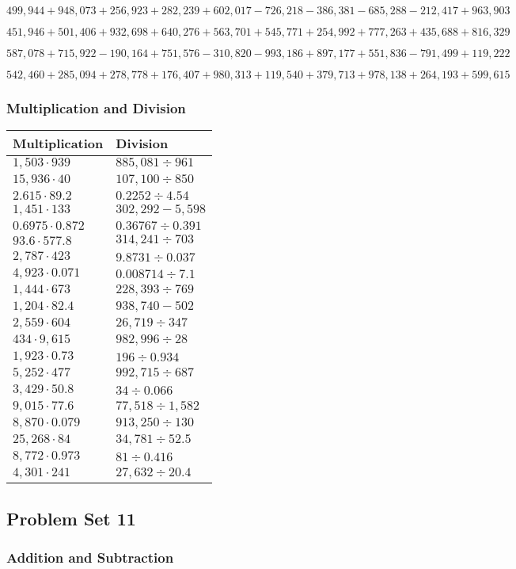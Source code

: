 \(499,944+948,073+256,923+282,239+602,017-726,218-386,381-685,288-212,417+963,903\)

\(451,946+501,406+932,698+640,276+563,701+545,771+254,992+777,263+435,688+816,329\)

\(587,078+715,922-190,164+751,576-310,820-993,186+897,177+551,836-791,499+119,222\)

\(542,460+285,094+278,778+176,407+980,313+119,540+379,713+978,138+264,193+599,615\)

\hypertarget{multiplication-and-division-314}{%
\subsubsection{Multiplication and
Division}\label{multiplication-and-division-314}}

\begin{longtable}[]{@{}ll@{}}
\toprule
Multiplication & Division\tabularnewline
\midrule
\endhead
\(1,503\cdot939\) & \(885,081÷961\)\tabularnewline
\(15,936\cdot40\) & \(107,100÷850\)\tabularnewline
\(2.615\cdot89.2\) & \(0.2252÷4.54\)\tabularnewline
\(1,451\cdot133\) & \(302,292 - 5,598\)\tabularnewline
\(0.6975\cdot0.872\) & \(0.36767÷0.391\)\tabularnewline
\(93.6\cdot577.8\) & \(314,241÷703\)\tabularnewline
\(2,787\cdot423\) & \(9.8731÷0.037\)\tabularnewline
\(4,923\cdot0.071\) & \(0.008714÷7.1\)\tabularnewline
\(1,444\cdot673\) & \(228,393÷769\)\tabularnewline
\(1,204\cdot82.4\) & \(938,740 - 502\)\tabularnewline
\(2,559\cdot604\) & \(26,719÷347\)\tabularnewline
\(434\cdot9,615\) & \(982,996÷28\)\tabularnewline
\(1,923\cdot0.73\) & \(196÷0.934\)\tabularnewline
\(5,252\cdot477\) & \(992,715÷687\)\tabularnewline
\(3,429\cdot50.8\) & \(34÷0.066\)\tabularnewline
\(9,015\cdot77.6\) & \(77,518÷1,582\)\tabularnewline
\(8,870\cdot0.079\) & \(913,250÷130\)\tabularnewline
\(25,268\cdot84\) & \(34,781÷52.5\)\tabularnewline
\(8,772\cdot0.973\) & \(81÷0.416\)\tabularnewline
\(4,301\cdot241\) & \(27,632÷20.4\)\tabularnewline
\bottomrule
\end{longtable}

\hypertarget{problem-set-11-5}{%
\subsection{Problem Set 11}\label{problem-set-11-5}}

\hypertarget{addition-and-subtraction-316}{%
\subsubsection{Addition and
Subtraction}\label{addition-and-subtraction-316}}

